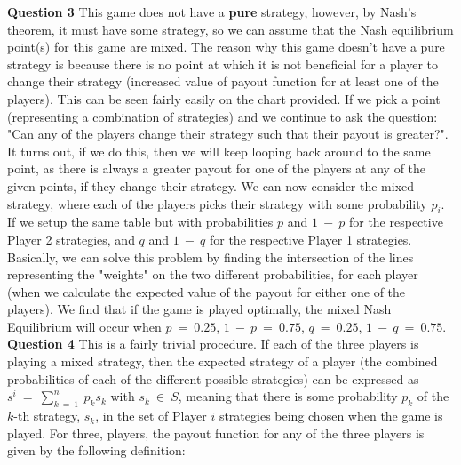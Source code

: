 \documentclass{article}
\begin{document}
\newline\newline
\textbf{Question 3}
\newline\newline
This game does not have a \textbf{pure} strategy, however, by Nash's theorem, it must have some strategy, so we can assume that the Nash equilibrium point(s) for this game are mixed. The reason why this game doesn't have a pure strategy is because there is no point at which it is not beneficial for a player to change their strategy (increased value of payout function for at least one of the players). This can be seen fairly easily on the chart provided. If we pick a point (representing a combination of strategies) and we continue to ask the question: "Can any of the players change their strategy such that their payout is greater?". It turns out, if we do this, then we will keep looping back around to the same point, as there is always a greater payout for one of the players at any of the given points, if they change their strategy. 
\newline\newline
We can now consider the mixed strategy, where each of the players picks their strategy with some probability $p_i$. If we setup the same table but with probabilities $p$ and $1 \ - \ p$ for the respective Player 2 strategies, and $q$ and $1 \ - \ q$ for the respective Player 1 strategies.  Basically, we can solve this problem by finding the intersection of the lines representing the "weights" on the two different probabilities, for each player (when we calculate the expected value of the payout for either one of the players). We find that if the game is played optimally, the mixed Nash Equilibrium will occur when $p \ = \ 0.25$, $1 \ - \ p \ = \ 0.75$, $q \ = \ 0.25$, $1 \ - \ q \ = \ 0.75$.
\newline\newline
\textbf{Question 4}
\newline\newline
This is a fairly trivial procedure. If each of the three players is playing a mixed strategy, then the expected strategy of a player (the combined probabilities of each of the different possible strategies) can be expressed as $s^i \ = \ \sum_{k \ = \ 1}^{n} \ p_ks_k$ with $s_k \ \in \ S$, meaning that there is some probability $p_k$ of the $k$-th strategy, $s_k$, in the set of Player $i$ strategies being chosen when the game is played. For three, players, the payout function for any of the three players is given by the following definition:
\end{document}
